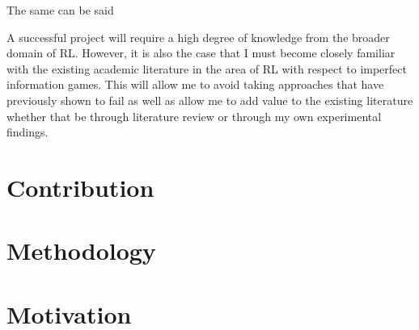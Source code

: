 The same can be said

A successful project will require a high degree of knowledge from the broader domain of RL. However, it is also the case
that I must become closely familiar with the existing academic literature in the area of RL with respect to imperfect
information games.
This will allow me to avoid taking approaches that have previously shown to fail as well as allow me to add value to
the existing literature whether that be through literature review or through my own experimental findings.


\section{Contribution}\label{sec:contribution}

\section{Methodology}\label{sec:methodology}

\section{Motivation}\label{sec:Motivation}